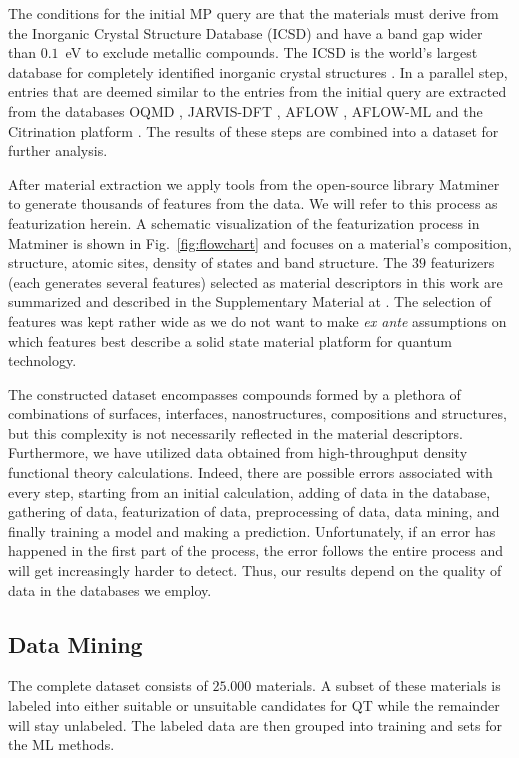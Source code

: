 \documentclass[superscriptaddress,unsortedaddress,
 amsmath,amssymb,
 aps,
]{revtex4-2}
\begin{document}
The conditions for the initial MP query are that the materials must derive from the Inorganic Crystal Structure Database (ICSD) and have a band gap wider than $0.1$~eV to exclude metallic compounds. The ICSD is the world's largest database for completely identified inorganic crystal structures \cite{Allen1987,Zagorac2019}. In a parallel step, entries that are deemed similar to the entries from the initial query are extracted from the databases OQMD  \cite{Saal2013,Kirklin2015}, JARVIS-DFT \cite{Choudhary2020}, AFLOW \cite{Curtarolo2012, Curtarolo2012a, Calderon2015}, AFLOW-ML \cite{Isayev2017} and the Citrination platform \cite{OMaraJordan2016MDIA}. The results of these steps are combined into a dataset for further analysis. 

After material extraction we apply tools from the open-source library Matminer \cite{Ward2018} to generate thousands of features from the data. We will refer to this process as featurization herein. A schematic visualization of the featurization process in Matminer is shown in  Fig.~\ref{fig:flowchart} 
and focuses on a material's composition,  structure, atomic sites, density of states and band structure. 
The $39$ featurizers (each generates several features) selected as material descriptors in this work are summarized and described in the Supplementary Material at \cite{supplementary}. The selection of features was kept rather wide as we do not want to make {\em ex ante} assumptions on which features best describe a solid state material platform for quantum technology. 

The constructed dataset encompasses compounds formed by a plethora of combinations of surfaces, interfaces, nanostructures, compositions and structures, but this complexity is not necessarily reflected in the material descriptors. 
Furthermore, we have utilized data obtained from high-throughput density functional theory calculations. Indeed, there are possible errors associated with every step, starting from an initial calculation, adding of data in the database, gathering of data, featurization of data, preprocessing of data, data mining, and finally training a model and making a prediction. Unfortunately, if an error has happened in the first part of the process, the error follows the entire process and will get increasingly harder to detect. Thus, our results depend on the quality of data in the databases we employ. 

\subsection*{Data Mining}
The complete dataset consists of $25.000$ materials. A subset of these materials is labeled into either suitable or unsuitable candidates for QT while the remainder will stay unlabeled. The labeled data are then grouped into training and sets for the ML methods. 
\end{document}
